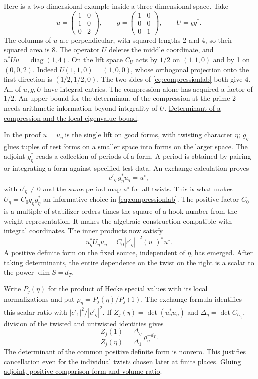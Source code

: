 \documentclass[11pt,letterpaper]{article}
\newcommand{\sref}[2]{\href{https://github.com/VladimirReshetnikov/ProveIt/blob/d8415e76ad850651f8c0083afe689dd9f4a45a10/Analysis/GeneralizedRiemannHypothesis/vendor/grh-lean/grh/src/#1.lean}{#2}}
\begin{document}
Here is a two-dimensional example inside a three-dimensional space. Take
\[
 u=\begin{pmatrix}1&0\\1&0\\0&2\end{pmatrix},\qquad
 g=\begin{pmatrix}1&0\\0&0\\0&1\end{pmatrix},\qquad U=gg^* .
\]
The columns of \(u\) are perpendicular, with squared lengths 2 and 4, so their squared area is \(8\). The operator \(U\) deletes the middle coordinate, and \(u^*Uu=\operatorname{diag}(1,4)\). On the lift space \(C_U\) acts by \(1/2\) on \((1,1,0)\) and by 1 on \((0,0,2)\). Indeed \(U(1,1,0)=(1,0,0)\), whose orthogonal projection onto the first direction is \((1/2,1/2,0)\). The two sides of \eqref{eq:compressionlab} both give 4. All of \(u,g,U\) have integral entries. The compression alone has acquired a factor of \(1/2\). An upper bound for the determinant of the compression at the prime 2 needs arithmetic information beyond integrality of \(U\). \sref{New/OneLift/LiftVolumeHeight}{Determinant of a compression and the local eigenvalue bound}.

In the proof \(u=u_\eta\) is the single lift on good forms, with twisting character \(\eta\); \(g_\eta\) glues tuples of test forms on a smaller space into forms on the larger space. The adjoint \(g_\eta^*\) reads a collection of periods of a form. A period is obtained by pairing or integrating a form against specified test data. An exchange calculation proves
\[
            c'_\eta\,g_\eta^*u_\eta=u^\circ ,
\]
with \(c'_\eta\ne0\) and the \emph{same} period map \(u^\circ\) for all twists. This is what makes \(U_\eta=C_0g_\eta g_\eta^*\) an informative choice in \eqref{eq:compressionlab}. The positive factor \(C_0\) is a multiple of stabilizer orders times the square of a hook number from the weight representation. It makes the algebraic construction compatible with integral coordinates. The inner products now satisfy
\[
       u_\eta^*U_\eta u_\eta
           = C_0|c'_\eta|^{-2}(u^\circ)^*u^\circ .
\]
A positive definite form on the fixed source, independent of \(\eta\), has emerged. After taking determinants, the entire dependence on the twist on the right is a scalar to the power \(\dim S=d_T\).

Write \(P_j(\eta)\) for the product of Hecke special values with its local normalizations and put \(\rho_\eta=P_j(\eta)/P_j(1)\). The exchange formula identifies this scalar ratio with \(|c'_1|^2/|c'_\eta|^2\). If \(Z_j(\eta)=\det(u_\eta^*u_\eta)\) and \(\Delta_\eta=\det C_{U_\eta}\), division of the twisted and untwisted identities gives
\begin{equation}
       \frac{Z_j(1)}{Z_j(\eta)}
         =\frac{\Delta_\eta}{\Delta_1}\,\rho_\eta^{-d_T}.
       \label{eq:delta-rho}
\end{equation}
The determinant of the common positive definite form is nonzero. This justifies cancellation even for the individual twists chosen later at finite places. \sref{New/OneLift/LiftVolumeHeight}{Gluing adjoint, positive comparison form and volume ratio}.
\end{document}
